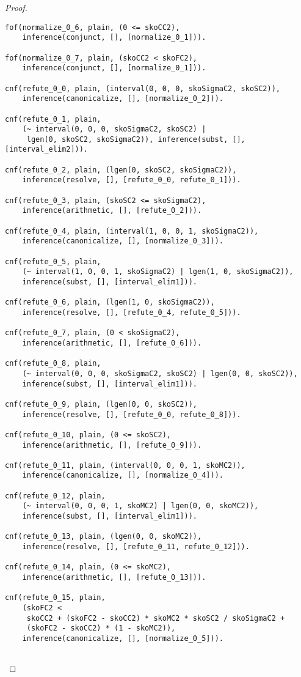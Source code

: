 \begin{proof}
\begin{verbatim}
fof(normalize_0_6, plain, (0 <= skoCC2),
    inference(conjunct, [], [normalize_0_1])).

fof(normalize_0_7, plain, (skoCC2 < skoFC2),
    inference(conjunct, [], [normalize_0_1])).

cnf(refute_0_0, plain, (interval(0, 0, 0, skoSigmaC2, skoSC2)),
    inference(canonicalize, [], [normalize_0_2])).

cnf(refute_0_1, plain,
    (~ interval(0, 0, 0, skoSigmaC2, skoSC2) |
     lgen(0, skoSC2, skoSigmaC2)), inference(subst, [], [interval_elim2])).

cnf(refute_0_2, plain, (lgen(0, skoSC2, skoSigmaC2)),
    inference(resolve, [], [refute_0_0, refute_0_1])).

cnf(refute_0_3, plain, (skoSC2 <= skoSigmaC2),
    inference(arithmetic, [], [refute_0_2])).

cnf(refute_0_4, plain, (interval(1, 0, 0, 1, skoSigmaC2)),
    inference(canonicalize, [], [normalize_0_3])).

cnf(refute_0_5, plain,
    (~ interval(1, 0, 0, 1, skoSigmaC2) | lgen(1, 0, skoSigmaC2)),
    inference(subst, [], [interval_elim1])).

cnf(refute_0_6, plain, (lgen(1, 0, skoSigmaC2)),
    inference(resolve, [], [refute_0_4, refute_0_5])).

cnf(refute_0_7, plain, (0 < skoSigmaC2),
    inference(arithmetic, [], [refute_0_6])).

cnf(refute_0_8, plain,
    (~ interval(0, 0, 0, skoSigmaC2, skoSC2) | lgen(0, 0, skoSC2)),
    inference(subst, [], [interval_elim1])).

cnf(refute_0_9, plain, (lgen(0, 0, skoSC2)),
    inference(resolve, [], [refute_0_0, refute_0_8])).

cnf(refute_0_10, plain, (0 <= skoSC2),
    inference(arithmetic, [], [refute_0_9])).

cnf(refute_0_11, plain, (interval(0, 0, 0, 1, skoMC2)),
    inference(canonicalize, [], [normalize_0_4])).

cnf(refute_0_12, plain,
    (~ interval(0, 0, 0, 1, skoMC2) | lgen(0, 0, skoMC2)),
    inference(subst, [], [interval_elim1])).

cnf(refute_0_13, plain, (lgen(0, 0, skoMC2)),
    inference(resolve, [], [refute_0_11, refute_0_12])).

cnf(refute_0_14, plain, (0 <= skoMC2),
    inference(arithmetic, [], [refute_0_13])).

cnf(refute_0_15, plain,
    (skoFC2 <
     skoCC2 + (skoFC2 - skoCC2) * skoMC2 * skoSC2 / skoSigmaC2 +
     (skoFC2 - skoCC2) * (1 - skoMC2)),
    inference(canonicalize, [], [normalize_0_5])).


\end{verbatim}
\end{proof}
